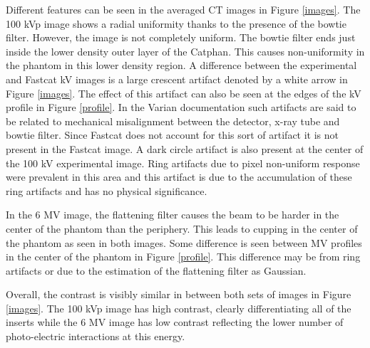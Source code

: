 Different features can be seen in the averaged CT images in Figure \ref{images}. The 100 kVp image shows a radial uniformity thanks to the presence of the bowtie filter. However, the image is not completely uniform. The bowtie filter ends just inside the lower density outer layer of the Catphan. This causes non-uniformity in the phantom in this lower density region. A difference between the experimental and Fastcat kV images is a large crescent artifact denoted by a white arrow in Figure \ref{images}. The effect of this artifact can also be seen at the edges of the kV profile in Figure \ref{profile}. In the Varian documentation such artifacts are said to be related to mechanical misalignment between the detector, x-ray tube and bowtie filter. Since Fastcat does not account for this sort of artifact it is not present in the Fastcat image. A dark circle artifact is also present at the center of the 100 kV experimental image. Ring artifacts due to pixel non-uniform response were prevalent in this area and this artifact is due to the accumulation of these ring artifacts and has no physical significance.

In the 6 MV image, the flattening filter causes the beam to be harder in the center of the phantom than the periphery. This leads to cupping in the center of the phantom as seen in both images. Some difference is seen between MV profiles in the center of the phantom in Figure \ref{profile}. This difference may be from ring artifacts or due to the estimation of the flattening filter as Gaussian. 

Overall, the contrast is visibly similar in between both sets of images in Figure \ref{images}. The 100 kVp image has high contrast, clearly differentiating all of the inserts while the 6 MV image has low contrast reflecting the lower number of photo-electric interactions at this energy.


